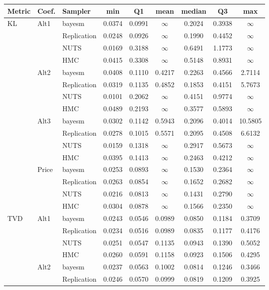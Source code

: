 \begin{tabular}{lllcccccc}
\toprule
Metric & Coef. & Sampler & min & Q1 & mean & median & Q3 & max \\
\midrule
KL & Alt1 & bayesm & 0.0374 & 0.0991 & $\infty$ & 0.2024 & 0.3938 & $\infty$ \\
 &  & Replication & 0.0248 & 0.0926 & $\infty$ & 0.1990 & 0.4452 & $\infty$ \\
 &  & NUTS & 0.0169 & 0.3188 & $\infty$ & 0.6491 & 1.1773 & $\infty$ \\
 &  & HMC & 0.0415 & 0.3308 & $\infty$ & 0.5148 & 0.8931 & $\infty$ \\
 & Alt2 & bayesm & 0.0408 & 0.1110 & 0.4217 & 0.2263 & 0.4566 & 2.7114 \\
 &  & Replication & 0.0319 & 0.1135 & 0.4852 & 0.1853 & 0.4151 & 5.7673 \\
 &  & NUTS & 0.0101 & 0.2062 & $\infty$ & 0.4151 & 0.9774 & $\infty$ \\
 &  & HMC & 0.0489 & 0.2193 & $\infty$ & 0.3577 & 0.5893 & $\infty$ \\
 & Alt3 & bayesm & 0.0302 & 0.1142 & 0.5943 & 0.2096 & 0.4014 & 10.5805 \\
 &  & Replication & 0.0278 & 0.1015 & 0.5571 & 0.2095 & 0.4508 & 6.6132 \\
 &  & NUTS & 0.0159 & 0.1318 & $\infty$ & 0.2917 & 0.5673 & $\infty$ \\
 &  & HMC & 0.0395 & 0.1413 & $\infty$ & 0.2463 & 0.4212 & $\infty$ \\
 & Price & bayesm & 0.0253 & 0.0893 & $\infty$ & 0.1530 & 0.2364 & $\infty$ \\
 &  & Replication & 0.0263 & 0.0854 & $\infty$ & 0.1652 & 0.2682 & $\infty$ \\
 &  & NUTS & 0.0216 & 0.0813 & $\infty$ & 0.1431 & 0.2790 & $\infty$ \\
 &  & HMC & 0.0304 & 0.0878 & $\infty$ & 0.1566 & 0.2350 & $\infty$ \\
TVD & Alt1 & bayesm & 0.0243 & 0.0546 & 0.0989 & 0.0850 & 0.1184 & 0.3709 \\
 &  & Replication & 0.0234 & 0.0516 & 0.0989 & 0.0835 & 0.1177 & 0.4176 \\
 &  & NUTS & 0.0251 & 0.0547 & 0.1135 & 0.0943 & 0.1390 & 0.5052 \\
 &  & HMC & 0.0260 & 0.0591 & 0.1158 & 0.0923 & 0.1506 & 0.4295 \\
 & Alt2 & bayesm & 0.0237 & 0.0563 & 0.1002 & 0.0814 & 0.1246 & 0.3466 \\
 &  & Replication & 0.0246 & 0.0570 & 0.0999 & 0.0819 & 0.1209 & 0.3925 \\

\end{tabular}
